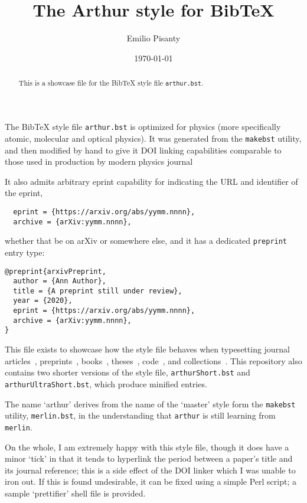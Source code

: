 \documentclass[%
  reprint,
  aps,
  pra,
  superscriptaddress,
  a4paper
]{revtex4-2}
\begin{document}
\title{The Arthur style for BibTeX}

\author{Emilio Pisanty}

\date{\today}

\begin{abstract}
This is a showcase file for the BibTeX style file \texttt{arthur.bst}.
\end{abstract}

\maketitle

The BibTeX style file \texttt{arthur.bst} is optimized for physics (more specifically atomic, molecular and optical physics). It was generated from the \texttt{makebst} utility, and then modified by hand to give it DOI linking capabilities comparable to those used in production by modern physics journal

It also admits arbitrary eprint capability for indicating the URL and identifier of the eprint,
\begin{verbatim}
  eprint = {https://arxiv.org/abs/yymm.nnnn},
  archive = {arXiv:yymm.nnnn},
\end{verbatim}
whether that be on arXiv or somewhere else, and it has a dedicated \texttt{preprint} entry type:
\begin{verbatim}
@preprint{arxivPreprint,
  author = {Ann Author},
  title = {A preprint still under review},
  year = {2020},
  eprint = {https://arxiv.org/abs/yymm.nnnn},
  archive = {arXiv:yymm.nnnn},
}  
\end{verbatim}

This file exists to showcase how the style file behaves when typesetting 
journal articles~\cite{journalArticle},
preprints~\cite{arxivPreprint}, 
books~\cite{bookExample}, 
theses~\cite{thesisExample}, 
code~\cite{codeExample}, and
collections~\cite{collectionExample}.
This repository also contains two shorter versions of the style file, \texttt{arthurShort.bst} and \texttt{arthurUltraShort.bst}, which produce minified entries.


The name `arthur' derives from the name of the `master' style form the \texttt{makebst} utility, \texttt{merlin.bst}, in the understanding that \texttt{arthur} is still learning from \texttt{merlin}.

On the whole, I am extremely happy with this style file, though it does have a minor `tick' in that it tends to hyperlink the period between a paper's title and its journal reference; this is a side effect of the DOI linker which I was unable to iron out. 
If this is found undesirable, it can be fixed using a simple Perl script; a sample `prettifier' shell file is provided.




{}
\end{document}
